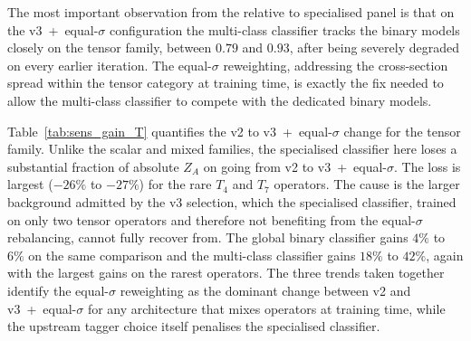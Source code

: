 The most important observation from the relative to specialised panel is that on the v3~+~equal-$\sigma$ configuration the multi-class classifier tracks the binary models closely on the tensor family, between $0.79$ and $0.93$, after being severely degraded on every earlier iteration. The equal-$\sigma$ reweighting, addressing the cross-section spread within the tensor category at training time, is exactly the fix needed to allow the multi-class classifier to compete with the dedicated binary models.

Table~\ref{tab:sens_gain_T} quantifies the v2 to v3~+~equal-$\sigma$ change for the tensor family. Unlike the scalar and mixed families, the specialised classifier here loses a substantial fraction of absolute $Z_A$ on going from v2 to v3~+~equal-$\sigma$. The loss is largest ($-26\%$ to $-27\%$) for the rare $T_4$ and $T_7$ operators. The cause is the larger background admitted by the v3 selection, which the specialised classifier, trained on only two tensor operators and therefore not benefiting from the equal-$\sigma$ rebalancing, cannot fully recover from. The global binary classifier gains $4\%$ to $6\%$ on the same comparison and the multi-class classifier gains $18\%$ to $42\%$, again with the largest gains on the rarest operators. The three trends taken together identify the equal-$\sigma$ reweighting as the dominant change between v2 and v3~+~equal-$\sigma$ for any architecture that mixes operators at training time, while the upstream tagger choice itself penalises the specialised classifier.

